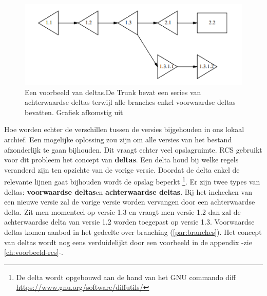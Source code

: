 \begin{figure}
\label{fig:deltas}
\begin{center}
  	\includegraphics[scale=0.6]{deltas.png}
\end{center}
\caption[Voorbeeld van deltas.]{Een voorbeeld van deltas.De Trunk bevat een series van achterwaardse deltas terwijl alle branches enkel voorwaardse deltas bevatten. Grafiek afkomstig uit \textcite{Tichy85rcs}}
\end{figure}

Hoe worden echter de verschillen tussen de versies bijgehouden in ons lokaal archief. Een mogelijke oplossing zou zijn om alle versies van het bestand afzonderlijk te gaan bijhouden. Dit vraagt echter veel opslagruimte. RCS gebruikt voor dit probleem het concept van \textbf{deltas}. Een delta houd bij welke regels veranderd zijn ten opzichte van de vorige versie. Doordat de delta enkel de relevante lijnen gaat bijhouden wordt de opslag beperkt \footnote{De delta wordt opgebouwd aan de hand van het GNU commando diff \url{https://www.gnu.org/software/diffutils/}}. Er zijn twee types van deltas: \textbf{voorwaardse deltas}en \textbf{achterwaardse deltas}. Bij het inchecken van een nieuwe versie zal de vorige versie worden vervangen door een achterwaardse delta. Zit men momenteel op versie 1.3 en  vraagt men versie 1.2 dan zal de achterwaardse delta van versie 1.2 worden toegepast op versie 1.3. Voorwaardse deltas komen aanbod in het gedeelte over branching (\ref{par:branches}). Het concept van deltas wordt nog eens verduidelijkt door een voorbeeld in de appendix -zie \ref{ch:voorbeeld-rcs}-.\\

